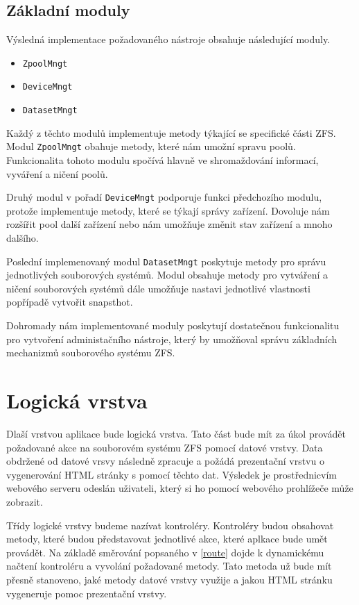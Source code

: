     \subsection{Základní moduly}
    Výsledná implementace požadovaného nástroje obsahuje následující moduly.
    \begin{itemize}
      \item \verb|ZpoolMngt|
      \item \verb|DeviceMngt|
      \item \verb|DatasetMngt|
    \end{itemize}

    Každý z těchto modulů implementuje metody týkající se specifické části ZFS. Modul \verb|ZpoolMngt| obahuje metody, které nám umožní spravu poolů. Funkcionalita tohoto modulu spočívá hlavně ve shromaždování informací, vyváření a ničení poolů.
     
    Druhý modul v pořadí \verb|DeviceMngt| podporuje funkci předchozího modulu, protože implementuje metody, které se týkají správy zařízení. Dovoluje nám rozšířit pool další zařízení nebo nám umožňuje změnit stav zařízení a mnoho dalšího.
     
    Poslední implemenovaný modul \verb|DatasetMngt| poskytuje metody pro správu jednotlivých souborových systémů. Modul obsahuje metody pro vytváření a ničení souborových systémů dále umožňuje nastavi jednotlivé vlastnosti popřípadě vytvořit snapsthot.

    Dohromady nám implementované moduly poskytují dostatečnou funkcionalitu pro vytvoření administačního nástroje, který by umožňoval správu základních mechanizmů souborového systému ZFS.
\section{Logická vrstva}
Dlaší vrstvou aplikace bude logická vrstva. Tato část bude mít za úkol provádět požadované akce na souborovém systému ZFS pomocí datové vrstvy. Data obdržené od datové vrsvy následně zpracuje a požádá prezentační vrstvu o vygenerování HTML stránky s pomocí těchto dat. Výsledek je prostřednicvím webového serveru odeslán uživateli, který si ho pomocí webového prohlížeče může zobrazit.

Třídy logické vrstvy budeme nazívat kontroléry. Kontroléry budou obsahovat metody, které budou představovat jednotlivé akce, které aplkace bude umět provádět. Na základě směrování popsaného v \ref{route} dojde k dynamickému načtení kontroléru a vyvolání požadované metody. Tato metoda už bude mít přesně stanoveno, jaké metody datové vrstvy využije a jakou HTML stránku vygeneruje pomoc prezentační vrstvy.
